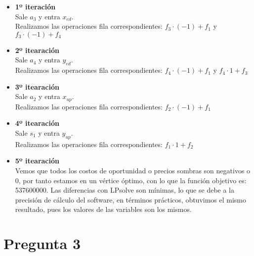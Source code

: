 \documentclass[spanish, fleqn]{article}
\begin{document}
	\begin{landscape}
		\vspace*{\fill}
			\begin{itemize}
				\item \textbf{1º iteración}
					\\
					Sale $a_3$ y entra $x_{ed}$.\\
					Realizamos las operaciones fila correspondientes: 
					$f_3\cdot(-1) + f_1$ y $f_3\cdot(-1) + f_4$
				\item \textbf{2º itearación}
					\\
					Sale $a_4$ y entra $y_{ed}$.\\
					Realizamos las operaciones fila correspondientes: 
					$f_4\cdot(-1) + f_1$ y $f_4\cdot{1} + f_3$
				\item \textbf{3º itearación}
					\\
					Sale $a_2$ y entra $x_{up}$.\\
					Realizamos las operaciones fila correspondientes:
					$f_2\cdot(-1) + f_1$
			\end{itemize}
		\vspace*{\fill}
		\newpage

		\vspace*{\fill}
			\begin{itemize}
				\item \textbf{4º itearación}
					\\
					Sale $s_1$ y entra $y_{up}$.\\
					Realizamos las operaciones fila correspondientes:
					$f_1\cdot{1} + f_2$
				\item \textbf{5º itearación}
					\\
					Vemos que todos los costos de oportunidad o precios sombras
					son negativos o 0, por tanto estamos en un vértice óptimo,
					con lo que la función objetivo es: 537600000.
					Las diferencias con LPsolve son mínimas, lo que se debe a la
					precisión de cálculo del software, en términos prácticos,
					obtuvimos el mismo resultado, pues los valores de las 
					variables son los mismos.
			\end{itemize}
		\vspace*{\fill}
	\end{landscape}

	\newpage
\section{Pregunta 3}
	
\end{document}
